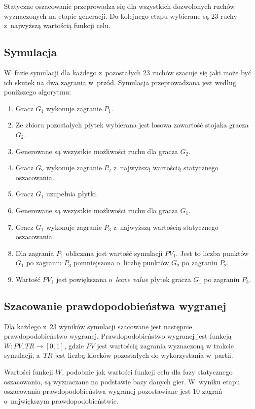 \documentclass[a4paper,twocolumn,12pt]{article}
\theoremstyle{definition}
\begin{document}
Statyczne oszacowanie przeprowadza się dla wszystkich dozwolonych ruchów wyznaczonych na etapie generacji. Do kolejnego etapu wybierane są 23 ruchy z~najwyższą wartością funkcji celu.

\subsection*{Symulacja}

W~fazie symulacji dla każdego z~pozostałych 23 ruchów szacuje się jaki może być ich skutek na dwa zagrania w~przód. Symulacja przeprowadzana jest według poniższego algorytmu:

\begin{enumerate}
	\item Gracz $G_{1}$ wykonuje zagranie $P_{1}$.
	\item Ze zbioru pozostałych płytek wybierana jest losowa zawartość stojaka gracza $G_{2}$.
	\item Generowane są wszystkie możliwości ruchu dla gracza $G_{2}$.
	\item Gracz $G_{2}$ wykonuje zagranie $P_{2}$ z~najwyższą wartością statycznego oszacowania.
	\item Gracz $G_{1}$ uzupełnia płytki. 
	\item Generowane są wszystkie możliwości ruchu dla gracza $G_{1}$.
	\item Gracz $G_{1}$ wykonuje zagranie $P_{3}$ z~najwyższą wartością statycznego oszacowania.
	\item Dla zagrania $P_{1}$ obliczana jest wartość symulacji $PV_{1}$. Jest to liczba punktów $G_{1}$ po zagraniu $P_{3}$ pomniejszona o~liczbę punktów $G_{2}$ po zagraniu $P_{2}$.
	\item Wartość $PV_{1}$ jest powiększana o~\emph{leave value} płytek gracza $G_{1}$ po zagraniu $P_{3}$.
\end{enumerate}

\subsection*{Szacowanie prawdopodobieństwa wygranej}

Dla każdego z~23 wyników symulacji szacowane jest następnie prawdopodobieństwo wygranej. Prawdopodobieństwo wygranej jest funkcją $W: PV, TR \rightarrow [0;1]$, gdzie $PV$ jest wartością zagrania wyznaczoną w trakcie symulacji, a~$TR$ jest liczbą klocków pozostałych do wykorzystania w~partii. 

Wartości funkcji $W$, podobnie jak wartości funkcji celu dla fazy statycznego oszacowania, są wyznaczane na podstawie bazy danych gier. W~wyniku etapu oszacowania prawdopodobieństwa wygranej pozostawiane jest 10 zagrań o~największym prawdopodobieństwie.
\end{document}
